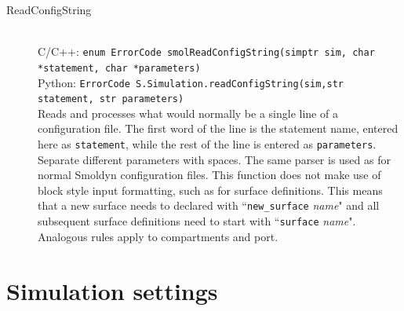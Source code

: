 \documentclass {scrbook}
\newcommand {\ttt} {\texttt}
\begin{document}
\begin{description}
\item[ReadConfigString]
\hfill \\
C/C++: \ttt{enum ErrorCode smolReadConfigString(simptr sim, char *statement, char *parameters)}\\
Python: \ttt{ErrorCode S.Simulation.readConfigString(sim,str statement, str parameters)}\\
Reads and processes what would normally be a single line of a configuration file. The first word of the line is the statement name, entered here as \ttt{statement}, while the rest of the line is entered as \ttt{parameters}. Separate different parameters with spaces. The same parser is used as for normal Smoldyn configuration files. This function does not make use of block style input formatting, such as for surface definitions. This means that a new surface needs to declared with ``\ttt{new\_surface} \emph{name}" and all subsequent surface definitions need to start with ``\ttt{surface} \emph{name}". Analogous rules apply to compartments and port.

\end{description}

\section{Simulation settings}
\end{document}
